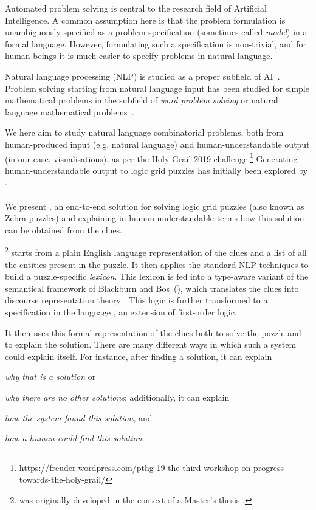 Automated problem solving is central to the research field of Artificial Intelligence. A common assumption here is that the problem formulation is unambiguously specified as a problem specification (sometimes called \textit{model}) in a formal language. However, formulating such a specification is non-trivial, and for human beings it is much easier to specify problems in natural language.

Natural language processing (NLP) is studied as a proper subfield of AI~\cite{manning1999foundations}. Problem solving starting from natural language input has been studied for simple mathematical problems in the subfield of \textit{word problem solving} or natural language mathematical problems~\cite{Mukherjee2008}.

We here aim to study natural language combinatorial problems, both from human-produced input (e.g. natural language) and human-understandable output (in our case, visualisations), as per the Holy Grail 2019 challenge.\footnote{https://freuder.wordpress.com/pthg-19-the-third-workshop-on-progress-towards-the-holy-grail/} Generating human-understandable output to logic grid puzzles has initially been explored by \citet{sqalli1996inference}.

\paragraph{}
We present \ourtool,  an end-to-end solution for solving logic grid puzzles (also known as Zebra puzzles) and explaining in human-understandable terms how this solution can be obtained from the clues. 

\ourtool\footnote{\ourtool was originally developed in the context of a Master's thesis \cite{msc/Claes17}.} starts from a plain English language representation of the clues and a list of all the entities present in the puzzle. It then applies the standard NLP techniques to build a puzzle-specific \textit{lexicon}. This lexicon is fed into a type-aware variant of the semantical framework of Blackburn and Bos~(\citeyear{Blackburn2005,Blackburn2006}), which translates the clues into discourse representation theory \cite{DRT}. This logic is further transformed to a specification in the \idp language , an extension of first-order logic. 

It then uses this formal representation of the clues both to solve the puzzle and to explain the solution. 
There are many different ways in which such a system could explain itself. For instance, after finding a solution, it can explain \begin{inparaenum}\item \emph{why that is a solution} or \item \emph{why there are no other solutions}; additionally, it can explain \item \emph{how the system found this solution}, and \item \emph{how a human could find this solution}. \end{inparaenum}
 
